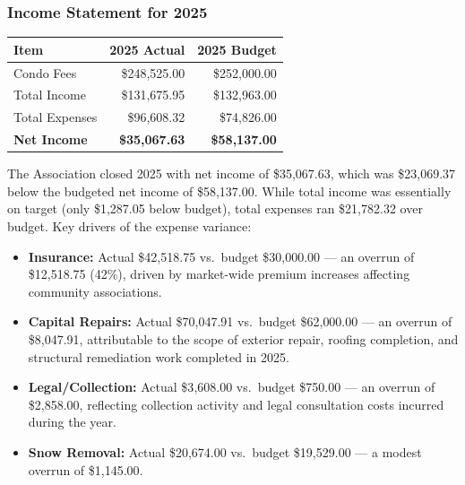 \documentclass[11pt]{article}
\newcommand{\strong}[1]{\textbf{#1}}
\newcommand{\money}[1]{\$#1}
\begin{document}
\subsubsection*{Income Statement for 2025}
\vspace{-0.6em}

\begin{center}
\begin{tabular}{@{}lrr@{}}
\toprule
\textbf{Item} & \textbf{2025 Actual} & \textbf{2025 Budget} \\
\midrule
Condo Fees & \money{248{,}525.00} & \money{252{,}000.00} \\
Total Income & \money{131{,}675.95} & \money{132{,}963.00} \\
Total Expenses & \money{96{,}608.32} & \money{74{,}826.00} \\
\midrule
\strong{Net Income} & \strong{\money{35{,}067.63}} & \strong{\money{58{,}137.00}} \\
\bottomrule
\end{tabular}
\end{center}

\noindent
The Association closed 2025 with net income of \money{35{,}067.63}, which was \money{23{,}069.37}
below the budgeted net income of \money{58{,}137.00}. While total income was essentially on
target (only \money{1{,}287.05} below budget), total expenses ran \money{21{,}782.32} over
budget. Key drivers of the expense variance:

\begin{itemize}[leftmargin=1.1em]
    \item \strong{Insurance:} Actual \money{42{,}518.75} vs.\ budget \money{30{,}000.00}
    --- an overrun of \money{12{,}518.75} (42\%), driven by market-wide premium increases
    affecting community associations.

    \item \strong{Capital Repairs:} Actual \money{70{,}047.91} vs.\ budget \money{62{,}000.00}
    --- an overrun of \money{8{,}047.91}, attributable to the scope of exterior repair,
    roofing completion, and structural remediation work completed in 2025.

    \item \strong{Legal/Collection:} Actual \money{3{,}608.00} vs.\ budget \money{750.00}
    --- an overrun of \money{2{,}858.00}, reflecting collection activity and legal consultation
    costs incurred during the year.

    \item \strong{Snow Removal:} Actual \money{20{,}674.00} vs.\ budget \money{19{,}529.00}
    --- a modest overrun of \money{1{,}145.00}.
\end{itemize}
\end{document}
